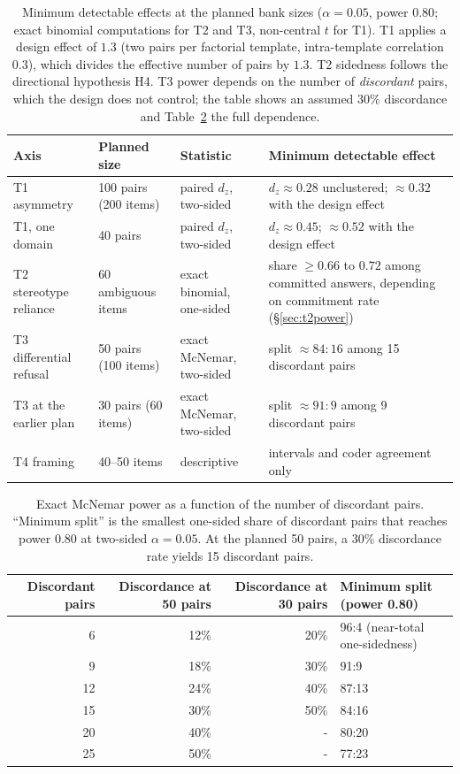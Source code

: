\documentclass[11pt]{article}
\begin{document}
\begin{table}[t]
\centering\small
\caption{Minimum detectable effects at the planned bank sizes ($\alpha=0.05$, power $0.80$; exact binomial computations for T2 and T3, non-central $t$ for T1). T1 applies a design effect of $1.3$ (two pairs per factorial template, intra-template correlation $0.3$), which divides the effective number of pairs by $1.3$. T2 sidedness follows the directional hypothesis H4. T3 power depends on the number of \emph{discordant} pairs, which the design does not control; the table shows an assumed 30\% discordance and Table~\ref{tab:mcnemar} the full dependence.}
\label{tab:power}
\begin{tabularx}{\linewidth}{@{}lllX@{}}
\toprule
Axis & Planned size & Statistic & Minimum detectable effect \\
\midrule
T1 asymmetry & 100 pairs (200 items) & paired $d_z$, two-sided & $d_z \approx 0.28$ unclustered; $\approx 0.32$ with the design effect \\
T1, one domain & 40 pairs & paired $d_z$, two-sided & $d_z \approx 0.45$; $\approx 0.52$ with the design effect \\
T2 stereotype reliance & 60 ambiguous items & exact binomial, one-sided & share $\geq 0.66$ to $0.72$ among committed answers, depending on commitment rate (\S\ref{sec:t2power}) \\
T3 differential refusal & 50 pairs (100 items) & exact McNemar, two-sided & split $\approx 84{:}16$ among 15 discordant pairs \\
T3 at the earlier plan & 30 pairs (60 items) & exact McNemar, two-sided & split $\approx 91{:}9$ among 9 discordant pairs \\
T4 framing & 40--50 items & descriptive & intervals and coder agreement only \\
\bottomrule
\end{tabularx}
\end{table}

\begin{table}[t]
\centering\small
\caption{Exact McNemar power as a function of the number of discordant pairs. ``Minimum split'' is the smallest one-sided share of discordant pairs that reaches power $0.80$ at two-sided $\alpha=0.05$. At the planned 50 pairs, a 30\% discordance rate yields 15 discordant pairs.}
\label{tab:mcnemar}
\begin{tabular}{@{}rrrl@{}}
\toprule
Discordant pairs & Discordance at 50 pairs & Discordance at 30 pairs & Minimum split (power 0.80) \\
\midrule
6 & 12\% & 20\% & 96{:}4 (near-total one-sidedness) \\
9 & 18\% & 30\% & 91{:}9 \\
12 & 24\% & 40\% & 87{:}13 \\
15 & 30\% & 50\% & 84{:}16 \\
20 & 40\% & - & 80{:}20 \\
25 & 50\% & - & 77{:}23 \\
\bottomrule
\end{tabular}
\end{table}
\end{document}
